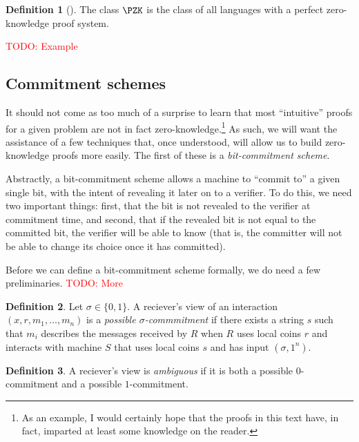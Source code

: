 \documentclass[english,12pt]{reedthesis}
\theoremstyle{plain}
\theoremstyle{definition}
\newtheorem{defn}[defn]{Definition}
\theoremstyle{remark}
\newcommand{\TODO}[1]{\textcolor{red}{TODO: #1}}
\begin{document}
\begin{defn}[{\cite[Def.\ 4.3.5]{Go01}}]\label{def:pzk}
  The class $\PZK$ is the class of all languages with a perfect zero-knowledge
  proof system.
\end{defn}

\TODO{Example}

\subsection{Commitment schemes}\label{sec:commitment-scheme}

It should not come as too much of a surprise to learn that most ``intuitive''
proofs for a given problem are not in fact zero-knowledge.\footnote{As an
  example, I would certainly hope that the proofs in this text have, in fact,
  imparted at least some knowledge on the reader.} As such, we will want the
assistance of a few techniques that, once understood, will allow us to build
zero-knowledge proofs more easily. The first of these is a \emph{bit-commitment
  scheme}.

Abstractly, a bit-commitment scheme allows a machine to ``commit to'' a given
single bit, with the intent of revealing it later on to a verifier. To do this,
we need two important things: first, that the bit is not revealed to the
verifier at commitment time, and second, that if the revealed bit is not equal
to the committed bit, the verifier will be able to know (that is, the committer
will not be able to change its choice once it has committed).

Before we can define a bit-commitment scheme formally, we do need a few
preliminaries.
\TODO{More}

\begin{defn}\label{def:possible-commit}
  Let $\sigma \in \{0, 1\}$. A reciever's view of an interaction
  $(x, r, m_{1}, \ldots, m_{n})$ is a \emph{possible $\sigma$-commmitment} if there exists
  a string $s$ such that $m_{i}$ describes the messages received by $R$ when $R$
  uses local coins $r$ and interacts with machine $S$ that uses local coins $s$
  and has input $(\sigma, 1^{n})$.
\end{defn}

\begin{defn}\label{def:ambiguous-view}
  A reciever's view is \emph{ambiguous} if it is both a possible $0$-commitment
  and a possible $1$-commitment.
\end{defn}
\end{document}

